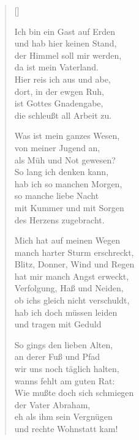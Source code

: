 \begin{multicols}{2}
\settowidth{\versewidth}{Ich bin ein Gast auf Erden}
\begin{verse}[\versewidth]

 Ich bin ein Gast auf Erden\\
und hab hier keinen Stand,\\
der Himmel soll mir werden,\\
da ist mein Vaterland.\\
Hier reis ich aus und abe,\\
dort, in der ewgen Ruh,\\
ist Gottes Gnadengabe,\\
die schleußt all Arbeit zu.

 Was ist mein ganzes Wesen,\\
von meiner Jugend an,\\
als Müh und Not gewesen?\\
So lang ich denken kann,\\
hab ich so manchen Morgen,\\
so manche liebe Nacht\\
mit Kummer und mit Sorgen\\
des Herzens zugebracht.

 Mich hat auf meinen Wegen\\
manch harter Sturm erschreckt,\\
Blitz, Donner, Wind und Regen\\
hat mir manch Angst erweckt,\\
Verfolgung, Haß und Neiden,\\
ob ichs gleich nicht verschuldt,\\
hab ich doch müssen leiden\\
und tragen mit Geduld

 So gings den lieben Alten,\\
an derer Fuß und Pfad\\
wir uns noch täglich halten,\\
wanns fehlt am guten Rat:\\
Wie mußte doch sich schmiegen\\
der Vater Abraham,\\
eh als ihm sein Vergnügen\\
und rechte Wohnstatt kam!


\end{verse}
\end{multicols}

